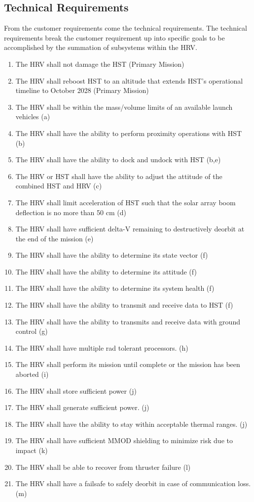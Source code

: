 \documentclass[paper=letter, fontsize=11pt]{scrartcl} %
\numberwithin{equation}{section} %
\numberwithin{figure}{section} %
\numberwithin{table}{section} %
\begin{document}
\subsection{Technical Requirements}

From the customer requirements come the technical requirements.  The technical requirements break the customer requirement up into specific goals to be accomplished by the summation of subsystems within the HRV.

\begin{enumerate}
    \item The HRV shall not damage the HST (Primary Mission)
    \item The HRV shall reboost HST to an altitude that extends HST's operational timeline to October 2028 (Primary Mission)
    \item The HRV shall be within the mass/volume limits of an available launch vehicles (a)
    \item The HRV shall have the ability to perform proximity operations with HST (b)
    \item The HRV shall have the ability to dock and undock with HST (b,e)
    \item The HRV or HST shall have the ability to adjust the attitude of the combined HST and HRV (c)
    \item The HRV shall limit acceleration of HST such that the solar array boom deflection is no more than 50 cm (d)
    \item The HRV shall have sufficient delta-V remaining to destructively deorbit at the end of the mission (e)
    \item The HRV shall have the ability to determine its state vector (f)
    \item The HRV shall have the ability to determine its attitude (f)
    \item The HRV shall have the ability to determine its system health (f)
    \item The HRV shall have the ability to transmit and receive data to HST (f)
    \item The HRV shall have the ability to transmits and receive data with ground control (g)
    \item The HRV shall have multiple rad tolerant processors. (h)
    \item The HRV shall perform its mission until complete or the mission has been aborted (i)
    \item The HRV shall store sufficient power (j)
    \item The HRV shall generate sufficient power. (j)
    \item The HRV shall have the ability to stay within acceptable thermal ranges. (j)
    \item The HRV shall have sufficient MMOD shielding to minimize risk due to impact (k)
    \item The HRV shall be able to recover from thruster failure (l)
    \item The HRV shall have a failsafe to safely deorbit in case of communication loss. (m)
\end{enumerate}
\end{document}
